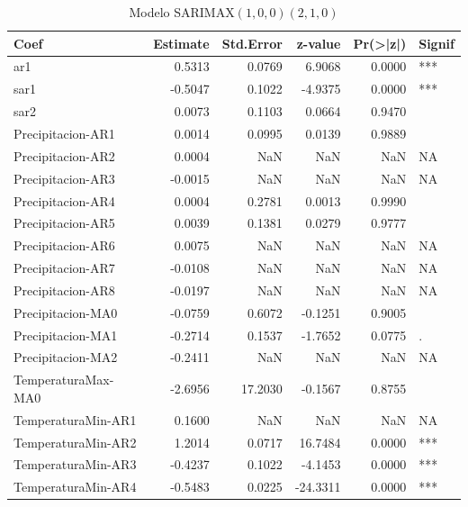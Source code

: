 \documentclass[12pt,oneside]{book}\usepackage[]{graphicx}\usepackage[]{color}
\newenvironment{knitrout}{}{} %
\theoremstyle{definition} %
\begin{document}
\begin{knitrout}
\color{fgcolor}\begin{table}

\caption{\label{tab:unnamed-chunk-50}\label{tab:sarimax_estim1}Modelo SARIMAX$(1,0,0)(2,1,0)$}
\centering
\begin{threeparttable}
\begin{tabular}[t]{lrrrrl}
\toprule
Coef & Estimate & Std.Error & z-value & Pr(>|z|) & Signif\\
\midrule
\rowcolor{gray!6}  ar1 & 0.5313 & 0.0769 & 6.9068 & 0.0000 & ***\\
sar1 & -0.5047 & 0.1022 & -4.9375 & 0.0000 & ***\\
\rowcolor{gray!6}  sar2 & 0.0073 & 0.1103 & 0.0664 & 0.9470 & \\
Precipitacion-AR1 & 0.0014 & 0.0995 & 0.0139 & 0.9889 & \\
\rowcolor{gray!6}  Precipitacion-AR2 & 0.0004 & NaN & NaN & NaN & NA\\
\addlinespace
Precipitacion-AR3 & -0.0015 & NaN & NaN & NaN & NA\\
\rowcolor{gray!6}  Precipitacion-AR4 & 0.0004 & 0.2781 & 0.0013 & 0.9990 & \\
Precipitacion-AR5 & 0.0039 & 0.1381 & 0.0279 & 0.9777 & \\
\rowcolor{gray!6}  Precipitacion-AR6 & 0.0075 & NaN & NaN & NaN & NA\\
Precipitacion-AR7 & -0.0108 & NaN & NaN & NaN & NA\\
\addlinespace
\rowcolor{gray!6}  Precipitacion-AR8 & -0.0197 & NaN & NaN & NaN & NA\\
Precipitacion-MA0 & -0.0759 & 0.6072 & -0.1251 & 0.9005 & \\
\rowcolor{gray!6}  Precipitacion-MA1 & -0.2714 & 0.1537 & -1.7652 & 0.0775 & .\\
Precipitacion-MA2 & -0.2411 & NaN & NaN & NaN & NA\\
\rowcolor{gray!6}  TemperaturaMax-MA0 & -2.6956 & 17.2030 & -0.1567 & 0.8755 & \\
\addlinespace
TemperaturaMin-AR1 & 0.1600 & NaN & NaN & NaN & NA\\
\rowcolor{gray!6}  TemperaturaMin-AR2 & 1.2014 & 0.0717 & 16.7484 & 0.0000 & ***\\
TemperaturaMin-AR3 & -0.4237 & 0.1022 & -4.1453 & 0.0000 & ***\\
\rowcolor{gray!6}  TemperaturaMin-AR4 & -0.5483 & 0.0225 & -24.3311 & 0.0000 & ***\\

\end{tabular}
\end{threeparttable}
\end{table}
\end{knitrout}
\end{document}
